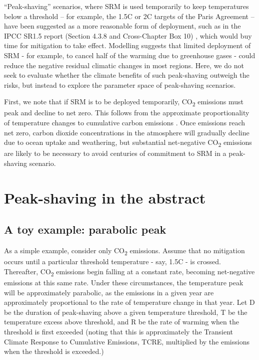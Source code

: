 \documentclass[draft]{agujournal2019}
\begin{document}
“Peak-shaving” scenarios, where SRM is used temporarily to keep temperatures below a threshold – for example, the 1.5C or 2C targets of the Paris Agreement – have been suggested as a more reasonable form of deployment, such as in the IPCC SR1.5 report (Section 4.3.8 and Cross-Chapter Box 10) \cite{de2018strengthening} \cite{macmartin2018solar}, which would buy time for mitigation to take effect. Modelling suggests that limited deployment of SRM - for example, to cancel half of the warming due to greenhouse gases - could reduce the negative residual climatic changes in most regions. \cite{irvine2019halving} Here, we do not seek to evaluate whether the climate benefits of such peak-shaving outweigh the risks, but instead to explore the parameter space of peak-shaving scenarios.

\medskip


First, we note that if SRM is to be deployed temporarily, CO\textsubscript{2} emissions must peak and decline to net zero. This follows from the approximate proportionality of temperature changes to cumulative carbon emissions \cite{allen2009warming}. Once emissions reach net zero, carbon dioxide concentrations in the atmosphere will gradually decline due to ocean uptake and weathering, but substantial net-negative CO\textsubscript{2} emissions are likely to be necessary to avoid centuries of commitment to SRM in a peak-shaving scenario. 


\section{Peak-shaving in the abstract}
\subsection{A toy example: parabolic peak}


As a simple example, consider only CO\textsubscript{2} emissions. Assume that no mitigation occurs until a particular threshold temperature - say, 1.5C - is crossed. Thereafter, CO\textsubscript{2} emissions begin falling at a constant rate, becoming net-negative emissions at this same rate. Under these circumstances, the temperature peak will be approximately parabolic, as the emissions in a given year are approximately proportional to the rate of temperature change in that year. Let D be the duration of peak-shaving above a given temperature threshold, T be the temperature excess above threshold, and R be the rate of warming when the threshold is first exceeded (noting that this is approximately the Transient Climate Response to Cumulative Emissions, TCRE, multiplied by the emissions when the threshold is exceeded.) 
\end{document}
